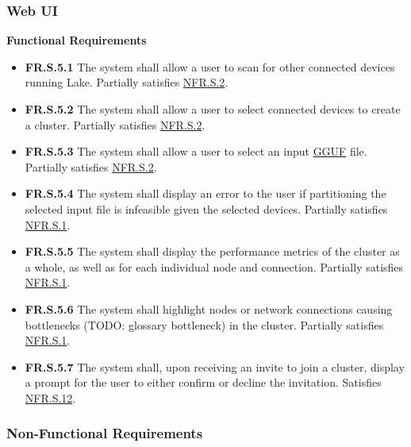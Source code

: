 \documentclass[12pt]{article}
\begin{document}
\subsubsection{Web UI}
\textbf{Functional Requirements}
\begin{itemize}
	\item \label{FR.S.5.1}\textbf{FR.S.5.1} The system shall allow a user to scan for other connected devices
		running Lake. Partially satisfies \hyperref[NFR.S.2]{NFR.S.2}.
	\item \label{FR.S.5.2}\textbf{FR.S.5.2} The system shall allow a user to select connected devices to create
		a cluster. Partially satisfies \hyperref[NFR.S.2]{NFR.S.2}.
	\item \label{FR.S.5.3}\textbf{FR.S.5.3} The system shall allow a user to select an input
		\href{https://github.com/ggml-org/ggml/blob/master/docs/gguf.md}{GGUF} file.
		Partially satisfies \hyperref[NFR.S.2]{NFR.S.2}.
	\item \label{FR.S.5.4}\textbf{FR.S.5.4} The system shall display an error to the user if partitioning the selected
		input file is infeasible given the selected devices. Partially satisfies \hyperref[NFR.S.1]{NFR.S.1}.
	\item \label{FR.S.5.5}\textbf{FR.S.5.5} The system shall display the performance metrics of the cluster as a whole,
		as well as for each individual node and connection. Partially satisfies \hyperref[NFR.S.1]{NFR.S.1}.
	\item \label{FR.S.5.6}\textbf{FR.S.5.6} The system shall highlight nodes or network connections causing bottlenecks (TODO: glossary bottleneck)
		in the cluster. Partially satisfies \hyperref[NFR.S.1]{NFR.S.1}.
	\item \label{FR.S.5.7}\textbf{FR.S.5.7} The system shall, upon receiving an invite to join a cluster, display a prompt
		for the user to either confirm or decline the invitation. Satisfies \hyperref[NFR.S.12]{NFR.S.12}.
\end{itemize}

\subsubsection{Non-Functional Requirements}
\end{document}
